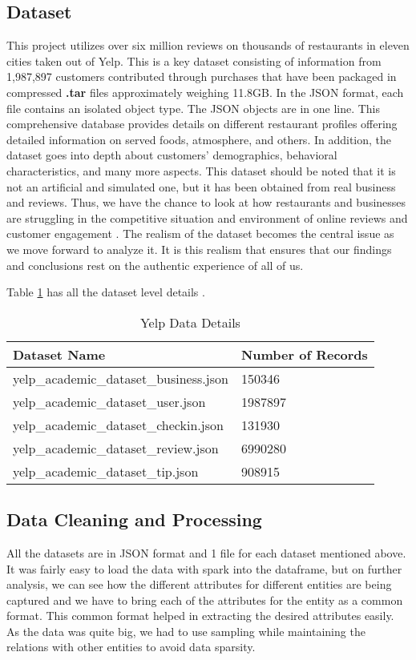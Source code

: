 \documentclass[conference]{IEEEtran}
\begin{document}
\subsection{Dataset}
This project utilizes over six million reviews on thousands of restaurants in eleven cities taken out of Yelp. This is a key dataset consisting of information from 1,987,897 customers contributed through purchases that have been packaged in compressed \textbf{.tar} files approximately weighing 11.8GB. In the JSON format, each file contains an isolated object type. The JSON objects are in one line. This comprehensive database provides details on different restaurant profiles offering detailed information on served foods, atmosphere, and others. In addition, the dataset goes into depth about customers’ demographics, behavioral characteristics, and many more aspects. This dataset should be noted that it is not an artificial and simulated one, but it has been obtained from real business and reviews. Thus, we have the chance to look at how restaurants and businesses are struggling in the competitive situation and environment of online reviews and customer engagement \cite{engagement}. The realism of the dataset becomes the central issue as we move forward to analyze it. It is this realism that ensures that our findings and conclusions rest on the authentic experience of all of us. 

Table \ref{table:dataset_details} has all the dataset level details \cite{}.

\begin{table}[htbp]
 \renewcommand{\arraystretch}{1.5}
  \label{table:dataset_details}
  \caption{Yelp Data Details}
  \begin{tabular}{|p{2.0in}|p{1.0in}|}
    \hline 
    \textbf{Dataset Name} & \textbf{Number of Records} \\
    \hline
    \hline
    yelp\_academic\_dataset\_business.json & 150346 \\
    \hline
    yelp\_academic\_dataset\_user.json & 1987897 \\
    \hline
    yelp\_academic\_dataset\_checkin.json & 131930 \\ 
    \hline
    yelp\_academic\_dataset\_review.json & 6990280 \\
    \hline
    yelp\_academic\_dataset\_tip.json &  908915 \\
    \hline
  \end{tabular}
\end{table}


\subsection{Data Cleaning and Processing}
All the datasets are in JSON format and 1 file for each dataset mentioned above. It was fairly easy to load the data with spark into the dataframe, but on further analysis, we can see how the different attributes for different entities are being captured and we have to bring each of the attributes for the entity as a common format. This common format helped in extracting the desired attributes easily. As the data was quite big, we had to use sampling while maintaining the relations with other entities to avoid data sparsity.
\end{document}

